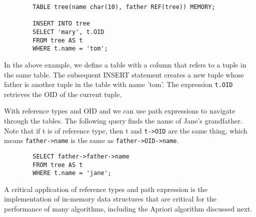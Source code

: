 \begin{verbatim}
        TABLE tree(name char(10), father REF(tree)) MEMORY;

        INSERT INTO tree
        SELECT 'mary', t.OID
        FROM tree AS t
        WHERE t.name = 'tom';
\end{verbatim}

In the above example, we define a table with a column that refers to a
tuple in the same table. The subsequent INSERT statement creates a new
tuple whose father is another tuple in the table with name 'tom'. The
expression \verb|t.OID| retrieves the OID of the current tuple.

With reference types and OID and we can use path expressions to
navigate through the tables. The following query finds the name of
Jane's grandfather. Note that if t is of reference type, then t and
\verb|t->OID| are the same thing, which means \verb|father->name| is the same as
\verb|father->OID->name|.

\begin{verbatim}
        SELECT father->father->name
        FROM tree AS t
        WHERE t.name = 'jane';
\end{verbatim}

A critical application of reference types and path expression is the
implementation of in-memory data structures that are critical for
the performance of many algorithms, including the Apriori algorithm
discussed next.
